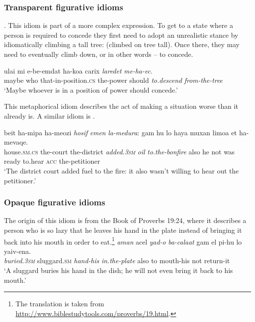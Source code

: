 \documentclass[output=paper]{langsci/langscibook}
\begin{document}
\subsubsection{Transparent figurative idioms}
\noindent{}.
This idiom is part of a more complex expression. To get to a state where a person is required to concede they first need to adopt an unrealistic stance by idiomatically climbing a tall tree:  (climbed on tree tall). Once there, they may need to eventually climb down, or in other words -- to concede.


	\ea\label{she:ec-canon}
    	\gll {\alef}ulai mi {\shin}e-be-{\ayin}emdat ha-koa{\het} carix \textit{laredet} \textit{me-ha-{\ayin}ec}.\\
    	   maybe who that-in-position.\textsc{cs} the-power should \textit{to.descend} \textit{from-the-tree}\\
    	\glt `Maybe whoever is in a position of power should concede.'
	\z

\noindent{} This metaphorical idiom describes the act of making a situation worse than it already is. A similar  idiom is .

	\ea\label{she:medura-canon}
    	\gll beit ha-mi{\shin}pa{\tet} ha-me{\het}ozi \textit{hosif} \textit{{\shin}emen} \textit{la-medura}: gam hu lo haya muxan li{\shin}mo{\ayin}a {\alef}et ha-mevaqe{\shin}.\\
    	   house.\textsc{sm}.\textsc{cs} the-court the-district \textit{added.\textsc{3sm}} \textit{oil} \textit{to.the-bonfire} also he not was ready to.hear \textsc{acc} the-petitioner\\
    	\glt `The district court added fuel to the fire: it also wasn't willing to hear out the petitioner.'
	\z

\subsubsection{Opaque figurative idioms}

\noindent{}
The origin of this idiom is from the Book of Proverbs 19:24, where it describes a person who is so lazy that he leaves his hand in the plate instead of bringing it back into his mouth in order to eat.\footnote{The translation is taken from \url{http://www.biblestudytools.com/proverbs/19.html}.}
    \ea\label{she:proverb}
        \gll \textit{{\tet}aman} {\ayin}acel \textit{yad-o} \textit{ba-cala{\het}at} gam {\alef}el pi-hu lo ya{\shin}iv-ena.\\
            \textit{buried.\textsc{3sm}} sluggard.\textsc{sm} \textit{hand-his} \textit{in.the-plate} also to mouth-his not return-it\\
        \glt `A sluggard buries his hand in the dish; he will not even bring it back to his mouth.'
    \z
\end{document}
